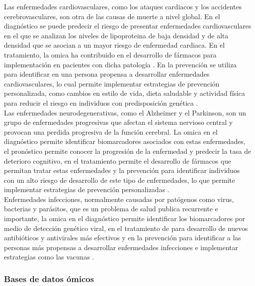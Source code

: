 Las enfermedades cardiovasculares, como los ataques cardiacos y los accidentes cerebrovasculares, son otra de las causas de muerte a nivel global. En el diagnóstico se puede predecir el riesgo de presentar enfermedades cardiovasculares en el que se analizan los niveles de lipoproteina de baja densidad y de alta densidad que se asocian a un mayor riesgo de enfermedad cardiaca. En el tratamiento, la omica ha contribuido en el desarrollo de fármacos para implementación en pacientes con dicha patología \citep{pasha2020cardiovascular}. En la prevención se utiliza para identificar en una persona propensa a desarrollar enfermedades cardiovasculares, lo cual permite implementar estrategias de prevención personalizada, como cambios en estilo de vida, dieta saludable y actividad física para reducir el riesgo en individuos con predisposición genética \citep{wang2017detecting}.\\

Las enfermedades neurodegenerativas, como el Alzheimer y el Parkinson, son un grupo de enfermedades progresivas que afectan el sistema nervioso central y provocan una perdida progresiva de la función cerebral. La omica en el diagnóstico permite identificar biomarcadores asociados con estas enfermedades, el pronóstico permite conocer la progresión de la enfermedad y predecir la tasa de deterioro cognitivo, en el tratamiento permite el desarrollo de fármacos que permitan tratar estas enfermedades y la prevención para identificar individuos con un alto riesgo de desarrollo de este tipo de enfermedades, lo que permite implementar estrategias de prevención personalizadas \citep{erdacs2021neurodegenerative}.\\

Enfermedades infecciones, normalmente causadas por patógenos como virus, bacterias y parásitos, que es un problema de salud publica recurrente e importante, la omica en el diagnóstico permite identificar los biomarcadores por medio de detección genético viral, en el tratamiento de para desarrollo de nuevos antibióticos y antivirales más efectivos y en la prevención para identificar a las personas más propensas a desarrollar enfermedades infecciones e implementar estrategias como las vacunas \citep{chae2018predicting}.



\subsubsection{Bases de datos ómicos}

